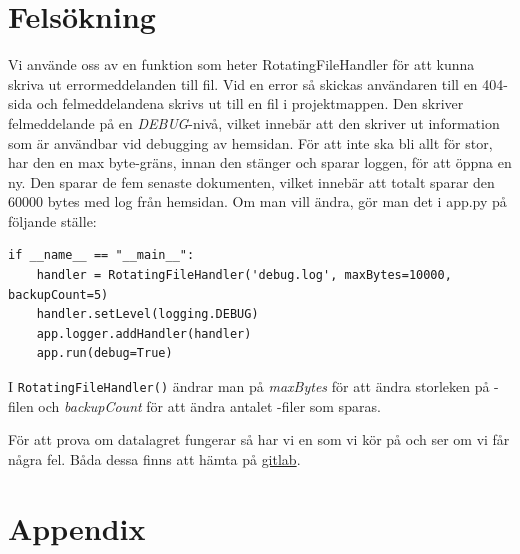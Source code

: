 \documentclass{TDP003mall}
\begin{document}
\section{Felsökning}
Vi använde oss av en funktion som heter RotatingFileHandler för att kunna skriva ut errormeddelanden till fil.
Vid en error så skickas användaren till en 404-sida och felmeddelandena skrivs ut till en fil  i projektmappen.
Den skriver felmeddelande på en \textit{DEBUG}-nivå, vilket innebär att den skriver ut information som är användbar vid debugging
av hemsidan. För att inte  ska bli allt för stor, har den en max byte-gräns, innan den stänger och sparar loggen, för att öppna en ny.
Den sparar de fem senaste dokumenten, vilket innebär att totalt sparar den 60000 bytes med log från hemsidan. Om man vill ändra, gör man det i app.py på följande ställe:
\begin{lstlisting}
if __name__ == "__main__":
    handler = RotatingFileHandler('debug.log', maxBytes=10000, backupCount=5)
    handler.setLevel(logging.DEBUG)
    app.logger.addHandler(handler)
    app.run(debug=True)
\end{lstlisting}
I \texttt{RotatingFileHandler()} ändrar man på \textit{maxBytes} för att ändra storleken på -filen och \textit{backupCount} för att ändra antalet -filer som sparas.


För att prova om datalagret fungerar så har vi en  som vi kör på  och ser om vi får några fel.
Båda dessa finns att hämta på \href{https://gitlab.ida.liu.se/filst04/tdp003-2018-database-tests.git}{gitlab}.
\newpage
\section{Appendix}
\begin{appendix}
  \listoffigures
\end{appendix}
\end{document}

